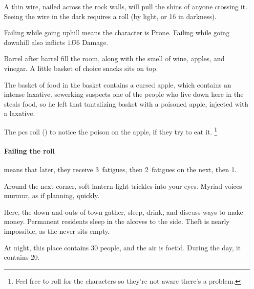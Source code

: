 A thin wire, nailed across the rock walls, will pull the shins of anyone crossing it.
Seeing the wire in the dark requires a  roll (\tn[12] by light, or 16 in darkness).

Failing while going uphill means the character is Prone.%
Failing while going downhill also inflicts $1D6$ Damage.

\begin{boxtext}

  Barrel after barrel fill the room, along with the smell of wine, apples, and vinegar.
  A little basket of choice snacks sits on top.

\end{boxtext}


\begin{exampletext}
  The basket of food in the basket contains a cursed apple, which contains an intense laxative.
  \Gls{sewerking} suspects one of the people who live down here in the  steals food, so he left that tantalizing basket with a poisoned apple, injected with a laxative.
\end{exampletext}

The \glspl{pc} roll  (\tn[11]) to notice the poison on the apple, if they try to eat it.%
\footnote{Feel free to roll for the characters so they're not aware there's a problem.}

\paragraph{Failing the roll}
means that  later, they receive 3~\glspl{fatigue}, then 2~\glspl{fatigue} on the next, then 1.

\begin{boxtext}
  Around the next corner, soft lantern-light trickles into your eyes.
  Myriad voices murmur, as if planning, quickly.
\end{boxtext}


Here, the down-and-outs of \gls{town} gather, sleep, drink, and discuss ways to make money.
Permanent residents sleep in the alcoves to the side.
Theft is nearly impossible, as the  never sits empty.

At night, this place contains 30 people, and the air is foetid.
During the day, it contains 20.

